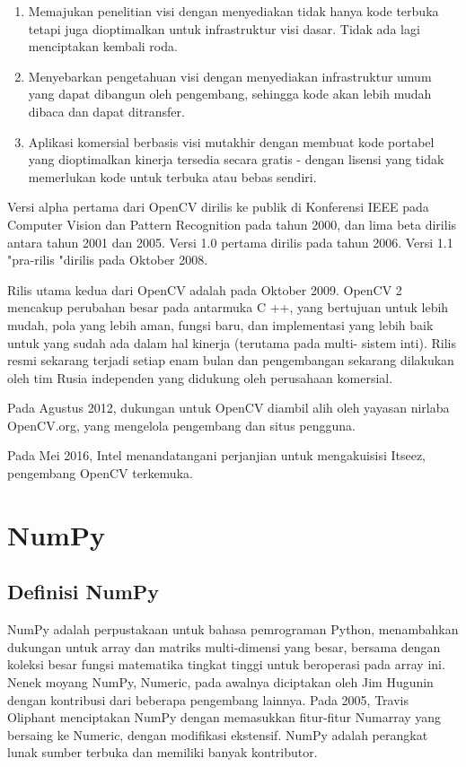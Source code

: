     \begin{enumerate}
	\item Memajukan penelitian visi dengan menyediakan tidak hanya kode terbuka tetapi juga dioptimalkan untuk infrastruktur visi dasar. Tidak ada lagi menciptakan kembali roda.
	\item Menyebarkan pengetahuan visi dengan menyediakan infrastruktur umum yang dapat dibangun oleh pengembang, sehingga kode akan lebih mudah dibaca dan dapat ditransfer.
	\item Aplikasi komersial berbasis visi mutakhir dengan membuat kode portabel yang dioptimalkan kinerja tersedia secara gratis - dengan lisensi yang tidak memerlukan kode untuk terbuka atau bebas sendiri.
	\end{enumerate} 

	Versi alpha pertama dari OpenCV dirilis ke publik di Konferensi IEEE pada Computer Vision dan Pattern Recognition pada tahun 2000, dan lima beta dirilis antara tahun 2001 dan 2005. Versi 1.0 pertama dirilis pada tahun 2006. Versi 1.1 "pra-rilis "dirilis pada Oktober 2008.

	Rilis utama kedua dari OpenCV adalah pada Oktober 2009. OpenCV 2 mencakup perubahan besar pada antarmuka C ++, yang bertujuan untuk lebih mudah, pola yang lebih aman, fungsi baru, dan implementasi yang lebih baik untuk yang sudah ada dalam hal kinerja (terutama pada multi- sistem inti). Rilis resmi sekarang terjadi setiap enam bulan dan pengembangan sekarang dilakukan oleh tim Rusia independen yang didukung oleh perusahaan komersial.

	Pada Agustus 2012, dukungan untuk OpenCV diambil alih oleh yayasan nirlaba OpenCV.org, yang mengelola pengembang dan situs pengguna.

	Pada Mei 2016, Intel menandatangani perjanjian untuk mengakuisisi Itseez, pengembang OpenCV terkemuka.

\newpage
\section{NumPy}
\subsection{Definisi NumPy}
NumPy adalah perpustakaan untuk bahasa pemrograman Python, menambahkan dukungan untuk array dan matriks multi-dimensi yang besar, bersama dengan koleksi besar fungsi matematika tingkat tinggi untuk beroperasi pada array ini. Nenek moyang NumPy, Numeric, pada awalnya diciptakan oleh Jim Hugunin dengan kontribusi dari beberapa pengembang lainnya. Pada 2005, Travis Oliphant menciptakan NumPy dengan memasukkan fitur-fitur Numarray yang bersaing ke Numeric, dengan modifikasi ekstensif. NumPy adalah perangkat lunak sumber terbuka dan memiliki banyak kontributor.

